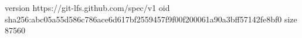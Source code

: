 version https://git-lfs.github.com/spec/v1
oid sha256:abc05a55d586c786ace6d617bf2559457f9f00f200061a90a3bff57142fe8bf0
size 87560
